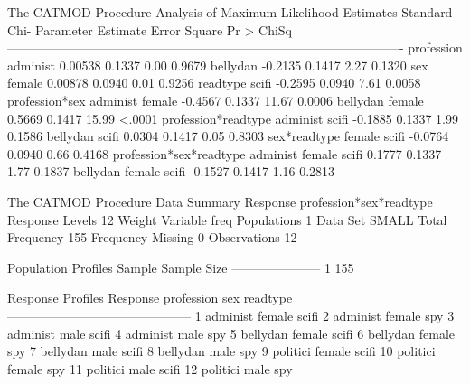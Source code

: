 \documentclass{article}
\begin{document}
\begin{Woutput}
The CATMOD Procedure
                           Analysis of Maximum Likelihood Estimates
                                                            Standard        Chi-
Parameter                                        Estimate      Error      Square    Pr > ChiSq
----------------------------------------------------------------------------------------------
profession              administ                  0.00538     0.1337        0.00        0.9679
                        bellydan                  -0.2135     0.1417        2.27        0.1320
sex                     female                    0.00878     0.0940        0.01        0.9256
readtype                scifi                     -0.2595     0.0940        7.61        0.0058
profession*sex          administ female           -0.4567     0.1337       11.67        0.0006
                        bellydan female            0.5669     0.1417       15.99        <.0001
profession*readtype     administ scifi            -0.1885     0.1337        1.99        0.1586
                        bellydan scifi             0.0304     0.1417        0.05        0.8303
sex*readtype            female scifi              -0.0764     0.0940        0.66        0.4168
profession*sex*readtype administ female scifi      0.1777     0.1337        1.77        0.1837
                        bellydan female scifi     -0.1527     0.1417        1.16        0.2813

The CATMOD Procedure
                           Data Summary
Response           profession*sex*readtype     Response Levels   12
Weight Variable    freq                        Populations        1
Data Set           SMALL                       Total Frequency  155
Frequency Missing  0                           Observations      12

 Population Profiles
Sample    Sample Size
---------------------
    1             155

             Response Profiles
Response    profession    sex       readtype
--------------------------------------------
    1       administ      female    scifi
    2       administ      female    spy
    3       administ      male      scifi
    4       administ      male      spy
    5       bellydan      female    scifi
    6       bellydan      female    spy
    7       bellydan      male      scifi
    8       bellydan      male      spy
    9       politici      female    scifi
   10       politici      female    spy
   11       politici      male      scifi
   12       politici      male      spy


\end{Woutput}
\end{document}
